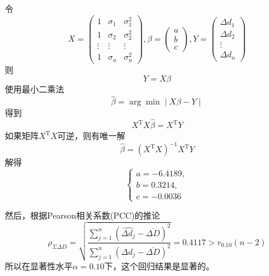 \documentclass{article}
\begin{document}
\begin{CJK}{UTF8}{song}
令
\begin{equation}\nonumber
  X =
  \left(
    \begin{array}{ccc}
      1 & \sigma_1 & \sigma^2_1 \\
      1 & \sigma_2 & \sigma^2_2 \\
      \vdots & \vdots & \vdots \\
      1 & \sigma_n & \sigma^2_n
    \end{array}
  \right)
,
  \beta = \left( \begin{array}{c}
            a \\
            b \\
            c
          \end{array}
    \right)
,
  Y = \left( \begin{array}{c}
            \Delta d_1 \\
            \Delta d_2 \\
            \vdots \\
            \Delta d_n
          \end{array} \right)
\end{equation}
则
\begin{equation}\nonumber
    Y=X\beta
\end{equation}
使用最小二乘法
\begin{equation}\nonumber
  \hat{\beta} = \arg \min \mid X \beta - Y \mid
\end{equation}
得到
\begin{equation}\nonumber
  X^{\textrm{T}}X \hat{\beta} =  X^{\textrm{T}} Y
\end{equation}
如果矩阵$X^{\textrm{T}}X$可逆，则有唯一解
\begin{equation}
  \hat{\beta} = \left( X^{\textrm{T}}X \right)^{-1}X^{\textrm{T}}Y
\end{equation}
解得
\begin{equation}
\left\{
  \begin{array}{l}
    a = -6.4189 ,  \\
    b = 0.3214,  \\
    c = -0.0036
  \end{array}
\right.
\end{equation}

然后，根据Pearson相关系数(PCC)的推论
\begin{equation}
  \rho_{\Sigma \Delta D}=\sqrt{\frac{\sum_{j=1}^n \left(\widehat{\Delta d_j}-\overline{\Delta D}\right)^2}{\sum_{j=1}^n \left(\Delta d_j-\overline{\Delta D}\right)^2}}=0.4117>r_{0.10}(n-2)
\end{equation}
所以在显著性水平$\alpha=0.10$下，这个回归结果是显著的。


\end{CJK}
\end{document}
